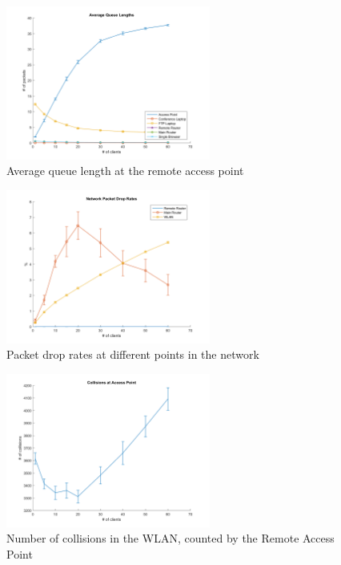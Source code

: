 \documentclass[
10pt, %
a4paper, %
oneside, %
headinclude,footinclude, %
BCOR5mm, %
]{scrartcl}
\begin{document}
\begin{figure}[!ht]
  \centering
  \includegraphics[width=0.6\textwidth]{Figures/nocctv/Average_Queue_Lengths.png}
  \caption{Average queue length at the remote access point} \label{fig:rap_queue_len}
\end{figure}

\begin{figure}[!ht]
  \centering
  \includegraphics[width=0.6\textwidth]{Figures/nocctv/Network_Packet_Drop_Rates.png}
  \caption{Packet drop rates at different points in the network} \label{fig:net_drop}
\end{figure}
\begin{figure}[!ht]
  \centering
  \includegraphics[width=0.6\textwidth]{Figures/nocctv/Collisions_at_Access_Point.png}
  \caption{Number of collisions in the WLAN, counted by the Remote Access Point} \label{fig:rap_collisions}
\end{figure}
\end{document}
